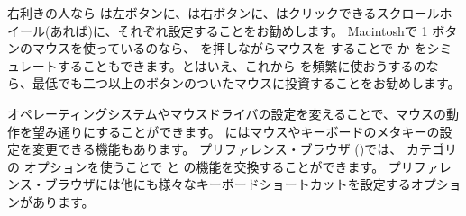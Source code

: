 \documentclass[a4paper,10pt,twoside]{book}
\begin{document}





右利きの人なら \click は左ボタンに、\actclick は右ボタンに、\metaclick はクリックできるスクロールホイール(あれば)に、それぞれ設定することをお勧めします。
Macintoshで 1 ボタンのマウスを使っているのなら、\clover{} を押しながらマウスを \click することで \actclick か \metaclick をシミュレートすることもできます。とはいえ、これから \pharo を頻繁に使おうするのなら、最低でも二つ以上のボタンのついたマウスに投資することをお勧めします。

オペレーティングシステムやマウスドライバの設定を変えることで、マウスの動作を望み通りにすることができます。
\pharo にはマウスやキーボードのメタキーの設定を変更できる機能もあります。
プリファレンス・ブラウザ ()では、 カテゴリの  オプションを使うことで \actclick と \metaclick の機能を交換することができます。
プリファレンス・ブラウザには他にも様々なキーボードショートカットを設定するオプションがあります。
\end{document}
